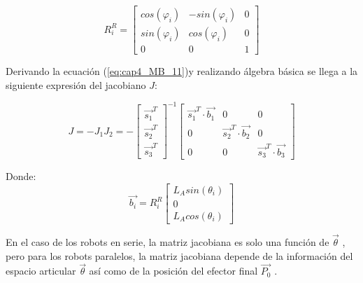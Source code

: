        \begin{equation}
         R_{i}^{R} =
        \begin{bmatrix}
                cos(\varphi_i)&-sin(\varphi_i)&0 \\
                sin(\varphi_i)&cos(\varphi_i)&0 \\
                0&0&1
            \end{bmatrix}
        \label{eq:cap4_MB_13}
    \end{equation}  
    
    
    Derivando la ecuación (\ref{eq:cap4_MB_11})y realizando álgebra básica se llega a la siguiente expresión del jacobiano $J$: 
    
    \begin{equation}
        J = -J_{1}J_{2}=-
        {\begin{bmatrix}
                \overrightarrow{s_{1}}^T \\
                \overrightarrow{s_{2}}^T \\
                \overrightarrow{s_{3}}^T
            \end{bmatrix}}^{-1}
        {\begin{bmatrix}
                \overrightarrow{s_{1}}^{T} \cdot \overrightarrow{b_{1}} &0&0\\
                0 &\overrightarrow{s_{2}}^{T}\cdot \overrightarrow{b_{2}}&0\\
                0 &0&\overrightarrow{s_{3}}^{T}\cdot \overrightarrow{b_{3}}
            \end{bmatrix}}
        \label{eq:cap4_MB_14}
    \end{equation}  
    
    Donde:
    \begin{equation}
        \overrightarrow{b_{i}} = R_{i}^{R}             
        \begin{bmatrix}
                L_{A} sin(\theta_i) \\
                0\\
                L_{A} cos(\theta_i) 
            \end{bmatrix}
        \label{eq:cap4_MB_15}
    \end{equation}  
    
    En el caso de los robots en serie, la matriz jacobiana es solo una función de $\overrightarrow{\theta}$   , pero para los robots paralelos, la matriz jacobiana depende de la información del espacio articular $\overrightarrow{\theta}$   así como de la posición del efector final $\overrightarrow{P_0}$   .
        \newpage

